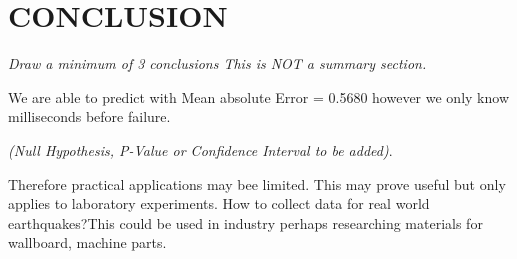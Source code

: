 \documentclass[]{llncs}
\begin{document}
\section{CONCLUSION}
{\em Draw a minimum of 3 conclusions  This is NOT a summary section.} 
\par

We are able to predict with Mean absolute Error = 0.5680 however we  only know milliseconds before failure.

{\em (Null Hypothesis, P-Value or Confidence Interval to be added)}.

 Therefore practical applications may bee limited. This may prove useful but only applies to laboratory experiments. How to collect data for real world earthquakes?This could be used in industry perhaps researching materials for wallboard, machine parts.
\par



\end{document}
